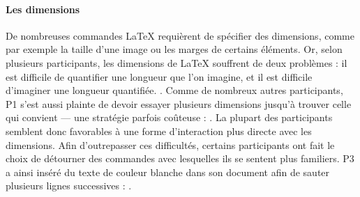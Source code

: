 \paragraph{Les dimensions}
De nombreuses commandes \LaTeX{} requièrent de spécifier des dimensions, comme par exemple la taille d'une image ou les marges de certains éléments.
Or, selon plusieurs participants, les dimensions de \LaTeX{} souffrent de deux problèmes :
il est difficile de quantifier une longueur que l'on imagine, et il est difficile d'imaginer une longueur quantifiée.
.
Comme de nombreux autres participants, P1 s'est aussi plainte de devoir essayer plusieurs dimensions jusqu'à trouver celle qui convient --- une stratégie parfois coûteuse : .
La plupart des participants semblent donc favorables à une forme d'interaction plus directe avec les dimensions.
Afin d'outrepasser ces difficultés, certains participants ont fait le choix de détourner des commandes avec lesquelles ils se sentent plus familiers.
P3 a ainsi inséré du texte de couleur blanche dans son document afin de sauter  plusieurs lignes successives : .

